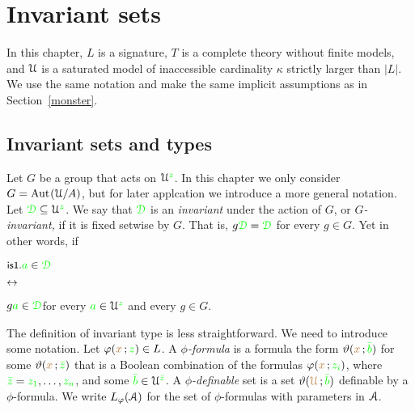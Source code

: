 \chapter{Invariant sets}
\label{invariant}

\def\medrel#1{\parbox[t]{6ex}{$\displaystyle\hfil #1$}}
\def\ceq#1#2#3{\parbox[t]{16ex}{$\displaystyle #1$}\medrel{#2}{$\displaystyle #3$}}

In this chapter, $L$ is a signature, $T$ is a complete theory without finite models, and $\EuScript U$ is a saturated model of inaccessible cardinality $\kappa$ strictly larger than $|L|$.
We use the same notation and make the same implicit assumptions as in Section~\ref{monster}.

\section{Invariant sets and types}\label{invariant_sets}

Let $G$ be a group that acts on $\EuScript U^{\color{green} z}$.
In this chapter we only consider $G={\rm Aut\kern.15ex}(\EuScript U/A)$, but for later applcation we introduce a more general notation.
Let ${\color{green}\EuScript D}\subseteq\EuScript U^{\color{green} z}$.
We say that ${\color{green}\EuScript D}$ is an \emph{invariant\/} under the action of $G$, or \emph{$G$-invariant,} if it is fixed setwise by $G$.
That is, $g{\color{green}\EuScript D}={\color{green}\EuScript D}$ for every $g\in G$.
Yet in other words, if

\ceq{\ssf{is1.}\hfill {\gr a}\in\grD}{\iff}{g{\gr a}\in\grD}\hfill for every ${\color{green} a}\in\EuScript U^{\color{green} z}$ and every $g\in G$.



The definition of invariant type is less straightforward.
We need to introduce some notation.
Let $\varphi({\color{brown} x}\,;{\color{green} z})\in L$.
A \emph{$\phi$-formula\/} is a formula the form $\vartheta({\color{brown} x}\,;{\color{green}\bar b})$ for some $\vartheta({\color{brown} x}\,;{\color{green}\bar z})$ that is a Boolean combination of the formulas $\varphi({\color{brown} x}\,;{\color{green} z_i})$, where ${\color{green}\bar z}={\color{green} z_1},\dots,{\color{green} z_n}$, and some ${\color{green}\bar b}\in\EuScript U^{\color{green}\bar z}$.
A \emph{$\phi$-definable\/} set is a set  $\vartheta({\color{brown}\EuScript U}\,;{\color{green}\bar b})$ definable by a $\phi$-formula.
We write $L_\varphi(\EuScript A)$ for the set of $\phi$-formulas with parameters in $\EuScript A$.

